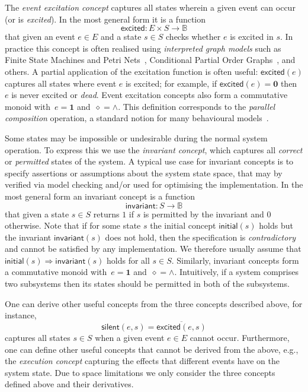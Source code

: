 \documentclass[british,compsoc]{IEEEtran}
\begin{document}
The \emph{event excitation concept} captures all states wherein a
given event can occur (or is \emph{excited}). In the most general
form it is a function
\[
\mathsf{excited}:E\times S\rightarrow\mathbb{B}
\]
that given an event $e\in E$ and a state $s\in S$ checks whether
$e$ is excited in $s$. In practice this concept is often realised
using \emph{interpreted graph models} such as Finite State Machines
and Petri Nets~\cite{Cortadella}, Conditional Partial Order Graphs~\cite{CPOG1},
and others. A partial application of the excitation function is often
useful: $\mathsf{excited}(e)$ captures all states where event $e$
is excited; for example, if $\mathsf{excited}(e)=\mathbf{0}$ then
$e$ is never excited or \emph{dead}. Event excitation concepts also
form a commutative monoid with~$e=\mathbf{1}$ and~$\diamond=\wedge$.
This definition corresponds to the \emph{parallel composition} operation,
a standard notion for many behavioural models~\cite{PCOMP}.

Some states may be impossible or undesirable during the normal system
operation. To express this we use the \emph{invariant concept}, which
captures all \emph{correct} or \emph{permitted} states of the system.
A typical use case for invariant concepts is to specify assertions
or assumptions about the system state space, that may by verified
via model checking and/or used for optimising the implementation.
In the most general form an invariant concept is a function
\[
\mathsf{invariant}:S\rightarrow\mathbb{B}
\]
that given a state $s\in S$ returns $1$ if $s$ is permitted by
the invariant and $0$ otherwise. Note that if for some state $s$
the initial concept $\mathsf{initial}(s)$ holds but the invariant
$\mathsf{invariant}(s)$ does not hold, then the specification is
\emph{contradictory} and cannot be satisfied by any implementation.
We therefore usually assume that $\mathsf{initial}(s)\Rightarrow\mathsf{invariant}(s)$
holds for all $s\in S$. Similarly, invariant concepts form a commutative
monoid with~$e=\mathbf{1}$ and~$\diamond=\wedge$. Intuitively,
if a system comprises two subsystems then its states should be permitted
in both of the subsystems.

One can derive other useful concepts from the three concepts described
above, for instance,
\[
\mathsf{silent}(e,s)=\overline{\mathsf{excited}(e,s)}
\]
captures all states $s\in S$ when a given event $e\in E$ cannot
occur. Furthermore, one can define other useful concepts that cannot
be derived from the above, e.g., the \emph{execution concept} capturing
the effects that different events have on the system state. Due to
space limitations we only consider the three concepts defined above
and their derivatives.
\end{document}
